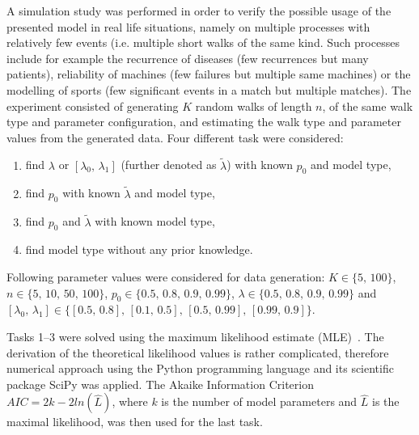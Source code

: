 \documentclass{amsart}
\theoremstyle{definition}
\theoremstyle{plain}
\theoremstyle{plain}
\theoremstyle{plain}
\numberwithin{equation}{section}
\begin{document}
    A simulation study was performed in order to verify the possible usage of the presented model in real life situations, namely on multiple processes with relatively few events (i.e. multiple short walks of the same kind.
    Such processes include for example the recurrence of diseases (few recurrences but many patients), reliability of machines (few failures but multiple same machines) or the modelling of sports (few significant events in a match but multiple matches).
    The experiment consisted of generating $K$ random walks of length $n$, of the same walk type and parameter configuration, and estimating the walk type and parameter values from the generated data.
    Four different task were considered:
    \begin{enumerate}
        \item find $\lambda$ or $[\lambda_{0},\,\lambda_{1}]$ (further denoted as $\tilde{\lambda}$) with known $p_{0}$ and model type,
        \item find $p_{0}$ with known $\tilde{\lambda}$ and model type,
        \item find $p_{0}$ and $\tilde{\lambda}$ with known model type,
        \item find model type without any prior knowledge.
    \end{enumerate}
    Following parameter values were considered for data generation: $K\in\{5,\,100\}$, $n\in\{5,\,10,\,50,\,100\}$, $p_{0}\in\{0.5,\,0.8,\,0.9,\,0.99\}$, $\lambda\in\{0.5,\,0.8,\,0.9,\,0.99\}$ and $[\lambda_{0},\,\lambda_{1}]\in\{[0.5,\,0.8],\,[0.1,\,0.5],\,[0.5,\,0.99],\,[0.99,\,0.9]\}$.


    Tasks 1--3 were solved using the maximum likelihood estimate (MLE)~\cite{rossi2018mathematical}.
    The derivation of the theoretical likelihood values is rather complicated, therefore numerical approach using the Python programming language and its scientific package SciPy was applied.
    The Akaike Information Criterion $AIC=2k-2ln(\hat{L})$, where $k$ is the number of model parameters and $\hat{L}$ is the maximal likelihood, was then used for the last task.
\end{document}
